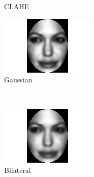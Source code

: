 \documentclass{llncs}
\begin{document}
\begin{figure}[t]
\begin{subfigure}[b]{0.2\textwidth}
                \caption{CLAHE}
                \label{fig:clahe}
        \end{subfigure}
        
        \begin{subfigure}[b]{0.2\textwidth}
                \centering
                \includegraphics[width=\textwidth]{angelina/Angelina_Jolie_0006_gaussian}
                \caption{Gaussian}
                \label{fig:gaussian} 
        \end{subfigure}
        ~ ~
        \begin{subfigure}[b]{0.2\textwidth}
                \centering
                \includegraphics[width=\textwidth]{angelina/Angelina_Jolie_0006_bilateral}
                \caption{Bilateral}
                \label{fig:bilateral}
        \end{subfigure}
        ~ ~
        \begin{subfigure}[b]{0.2\textwidth}
                \centering

\end{subfigure}
\end{figure}
\end{document}
